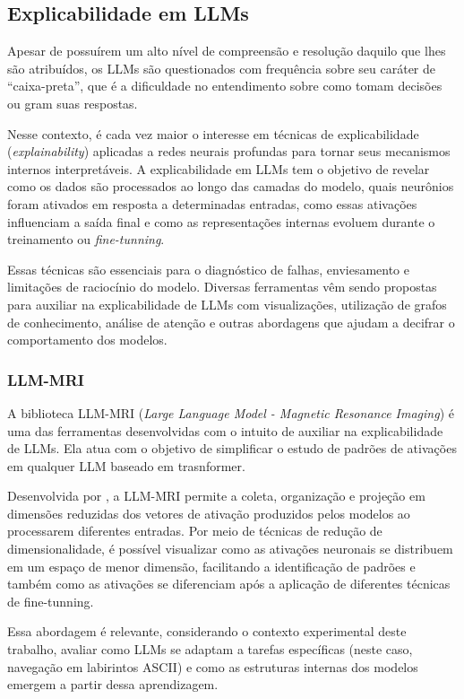 \subsection{Explicabilidade em LLMs}

Apesar de possuírem um alto nível de compreensão e resolução daquilo que lhes são atribuídos, os LLMs são questionados com frequência sobre seu caráter de ``caixa-preta'', que é a dificuldade no entendimento sobre como tomam decisões ou gram suas respostas.

Nesse contexto, é cada vez maior o interesse em técnicas de explicabilidade (\textit{explainability}) aplicadas a redes neurais profundas para tornar seus mecanismos internos interpretáveis. A explicabilidade em LLMs tem o objetivo de revelar como os dados são processados ao longo das camadas do modelo, quais neurônios foram ativados em resposta a determinadas entradas, como essas ativações influenciam a saída final e como as representações internas evoluem durante o treinamento ou \textit{fine-tunning}.

Essas técnicas são essenciais para o diagnóstico de falhas, enviesamento e limitações de raciocínio do modelo. Diversas ferramentas vêm sendo propostas para auxiliar na explicabilidade de LLMs com visualizações, utilização de grafos de conhecimento, análise de atenção e outras abordagens que ajudam a decifrar o comportamento dos modelos.

\subsubsection{LLM-MRI}

A biblioteca LLM-MRI (\textit{Large Language Model - Magnetic Resonance Imaging}) é uma das ferramentas desenvolvidas com o intuito de auxiliar na explicabilidade de LLMs. Ela atua com o objetivo de simplificar o estudo de padrões de ativações em qualquer LLM baseado em trasnformer.

Desenvolvida por \cite{costa2024llmmri}, a LLM-MRI permite a coleta, organização e projeção em dimensões reduzidas dos vetores de ativação produzidos pelos modelos ao processarem diferentes entradas. Por meio de técnicas de redução de dimensionalidade, é possível visualizar como as ativações neuronais se distribuem em um espaço de menor dimensão, facilitando a identificação de padrões e também como as ativações se diferenciam após a aplicação de diferentes técnicas de fine-tunning.

Essa abordagem é relevante, considerando o contexto experimental deste trabalho, avaliar como LLMs se adaptam a tarefas específicas (neste caso, navegação em labirintos ASCII) e como as estruturas internas dos modelos emergem a partir dessa aprendizagem.

